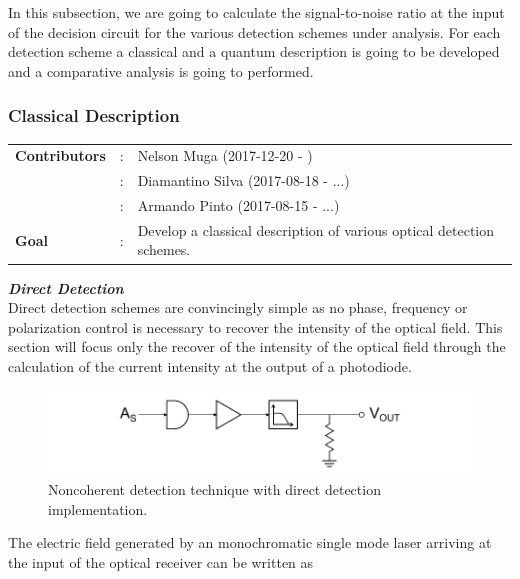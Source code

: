 In this subsection, we are going to calculate the signal-to-noise ratio at the input of the decision circuit for the various detection schemes under analysis.
For each detection scheme a classical and a quantum description is going to be developed and a comparative analysis is going to performed.

\subsubsection{Classical Description}

\begin{tcolorbox}	
\begin{tabular}{p{2.75cm} p{0.2cm} p{10.5cm}}
\textbf{Contributors}  &:& Nelson Muga (2017-12-20 - )\\
                       &:& Diamantino Silva (2017-08-18 - ...)\\
                       &:& Armando Pinto (2017-08-15 - ...)\\
\textbf{Goal}          &:& Develop a classical description of various optical detection schemes.\\
\end{tabular}
\end{tcolorbox}

{\bf \em Direct Detection }\\

Direct detection schemes are convincingly simple as no phase, frequency or polarization control is necessary to recover the intensity of the optical field. This section will focus only the recover of the intensity of the optical field through the calculation of the current intensity at the output of a photodiode.


\begin{figure}[h]
	\centering
	\includegraphics{./sdf/optical_detection/figures/detection-direct.pdf}
	\caption{Noncoherent detection technique with direct detection implementation.}\label{fig:detection_direct}
\end{figure}

\noindent


The electric field generated by an monochromatic single mode laser arriving at the input of the optical receiver can be written as

